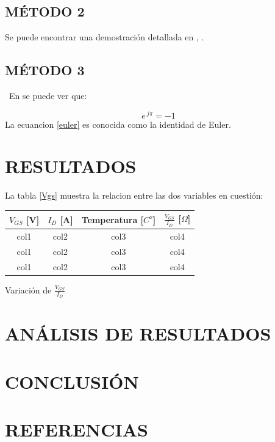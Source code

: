 \documentclass[]{article}
\makeatletter
\newenvironment{tablehere}		%
  {\def\@captype{table}}		%
  {}							%
\makeatother
\begin{document}
\begin{multicols}{2}
\subsection{MÉTODO 2} %
\lipsum[7]
Se puede encontrar una demostración detallada en \cite{Sh:575} , \cite{Sh:572}.
\subsection{MÉTODO 3} %
\
\lipsum[8] En \cite{webster} se puede ver que:

\begin{equation}
 e^{ \ j  \pi} = -1
 \label{euler}
\end{equation}
La ecuancion \ref{euler} es conocida como la identidad de Euler.
\section{RESULTADOS}
La tabla \ref{Vgs} muestra la relacion entre las dos variables en cuestión:
\begin{tablehere}
\begin{center}
\begin{tabular}{|c|c|c|c|}
\hline
$V_{GS}$ [V] & $I_{D}$ [A] & Temperatura [$C^{o}$] & $\frac{V_{GS}}{I_D}$ [$\Omega$] \\ 
\hline
col1 & col2 & col3 & col4 \\

col1 & col2 & col3 & col4 \\

col1 & col2 & col3 & col4 \\
\hline
\end{tabular}
\caption{Variación de $\frac{V_{GS}}{I_D}$}
\label{Vgs}
\end{center}
\end{tablehere}
\lipsum[1]


\section{ANÁLISIS DE RESULTADOS}
\lipsum[1]
\section{CONCLUSIÓN}
\lipsum[1]
\section{REFERENCIAS}
\printbibliography 
\end{multicols}
 
\end{document}
